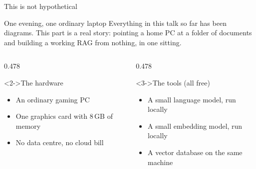 \documentclass[aspectratio=169,11pt]{beamer}
\begin{document}
\begin{frame}{This is not hypothetical}
  \begin{block}{One evening, one ordinary laptop}
    Everything in this talk so far has been diagrams. This part is a real
    story: pointing a home PC at a folder of documents and building a working
    RAG from nothing, in one sitting.
  \end{block}
  \medskip
  \begin{columns}[T,onlytextwidth]
    \begin{column}{0.478\textwidth}
      \begin{exampleblock}<2->{The hardware}
        \begin{itemize}
          \item An ordinary gaming PC
          \item One graphics card with 8\,GB of memory
          \item No data centre, no cloud bill
        \end{itemize}
      \end{exampleblock}
    \end{column}
    \begin{column}{0.478\textwidth}
      \begin{exampleblock}<3->{The tools (all free)}
        \begin{itemize}
          \item A small language model, run locally
          \item A small embedding model, run locally
          \item A vector database on the same machine
        \end{itemize}
      \end{exampleblock}
    \end{column}
  \end{columns}
  \medskip
\end{frame}
\end{document}
